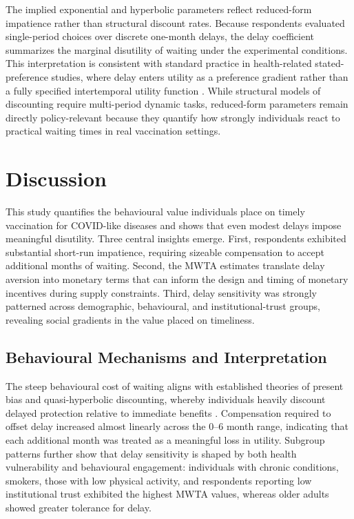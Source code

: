 \documentclass[12pt]{article}
\begin{document}
The implied exponential and hyperbolic parameters reflect reduced-form impatience rather 
than structural discount rates. Because respondents evaluated single-period choices over 
discrete one-month delays, the delay coefficient summarizes the marginal disutility of 
waiting under the experimental conditions. This interpretation is consistent with standard 
practice in health-related stated-preference studies, where delay enters utility as a 
preference gradient rather than a fully specified intertemporal utility function 
\parencite{vanderPol2001b,Attema2018}. While structural models of discounting require 
multi-period dynamic tasks, reduced-form parameters remain directly policy-relevant 
because they quantify how strongly individuals react to practical waiting times in real 
vaccination settings.

\section{Discussion}
\doublespacing

This study quantifies the behavioural value individuals place on timely vaccination for 
COVID-like diseases and shows that even modest delays impose meaningful disutility. Three 
central insights emerge. First, respondents exhibited substantial short-run impatience, 
requiring sizeable compensation to accept additional months of waiting. Second, the MWTA 
estimates translate delay aversion into monetary terms that can inform the design and timing 
of monetary incentives during supply constraints. Third, delay sensitivity was strongly 
patterned across demographic, behavioural, and institutional-trust groups, revealing social 
gradients in the value placed on timeliness.

\subsection{Behavioural Mechanisms and Interpretation}

The steep behavioural cost of waiting aligns with established theories of present bias and 
quasi-hyperbolic discounting, whereby individuals heavily discount delayed protection 
relative to immediate benefits \citep{Laibson1997,ODonoghue2001}. Compensation required to 
offset delay increased almost linearly across the 0--6 month range, indicating that each 
additional month was treated as a meaningful loss in utility. Subgroup patterns further show 
that delay sensitivity is shaped by both health vulnerability and behavioural engagement: 
individuals with chronic conditions, smokers, those with low physical activity, and 
respondents reporting low institutional trust exhibited the highest MWTA values, whereas 
older adults showed greater tolerance for delay.
\end{document}
